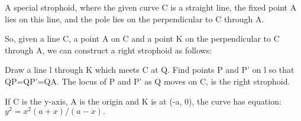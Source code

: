 A special strophoid, where the given curve C is a straight line, the
fixed point A lies on this line, and the pole lies on the perpendicular
to C through A.
\par
So, given a line C, a point A on C and a point K on the perpendicular to 
C through A, we can construct a right strophoid as follows:
\par
Draw a line l through K which meets C at Q. Find points P and P' on 
l so that QP=QP'=QA. The locus of P and P' as Q moves on C, is the right strophoid.
\par
If C is the y-axis, A is the origin and K is at (-a, 0), the curve has
equation: $y^{2}=x^{2}(a+x)/(a-x).$ 